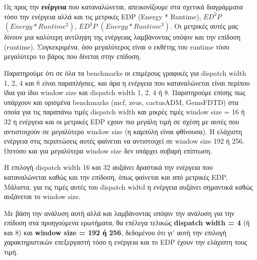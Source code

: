    Ως προς την \textbf{ενέργεια} που καταναλώνεται, απεικονίζουμε στα σχετικά
   διαγράμματα τόσο την ενέργεια αλλά και τις μετρικές EDP (Energy * Runtime),
   $ED^2P$ $(Energy * Runtime^2)$, $ED^3P$ $(Energy * Runtime^3)$. Οι μετρικές
   αυτές μας δίνουν μια καλύτερη αντίληψη της ενέργειας λαμβάνοντας υπόψιν και
   την επίδοση (runtime). Συγκεκριμένα, όσο μεγαλύτερος είναι ο εκθέτης του
   runtime τόσο μεγαλύτερο το βάρος που δίνεται στην επίδοση.
   
   Παρατηρούμε ότι σε όλα τα benchmarks οι επιμέρους γραφικές για dispatch width
   1, 2, 4 και 8 είναι παραπλήσιες, και άρα η ενέργεια που καταναλώνεται είναι
   περίπου ίδια για ίδιο window size και dispatch width  1, 2, 4 ή 8.
   Παρατηρούμε επίσης πως υπάρχουν και ορισμένα benchmarks (mcf, zeus,
   cactusADM, GemsFDTD) στα οποία για τις παραπάνω τιμές dispatch width και
   μικρές τιμές window size = 16 ή 32 η ενέργεια και οι μετρικές EDP εχουν πιο
   μεγάλη τιμή σε σχέση με αυτές που αντιστοιχούν σε μεγαλύτερο window size (η
   καμπύλη είναι φθίνουσα). Η ελάχιστη ενέργεια στις περιπτώσεις αυτές φαίνεται
   να αντιστοιχεί σε window size 192 ή 256. Ωστόσο και για μεγαλύτερα window
   size δεν υπάρχει σοβαρή επίπτωση.
  
   Η επιλογή dispatch width 16 και 32 αυξάνει δραστικά την ενέργεια που
   καταναλώνεται καθώς και την επίδοση, όπως φαίνεται και από μετρικές EDP.
   Mάλιστα, για τις τιμές αυτές του dispatch widtd η ενέργεια αυξάνει
   σημαντικά καθώς αυξάνεται το window size. 
   
   Με βάση την ανάλυση αυτή αλλά και λαμβάνοντας υπόψιν την ανάλυση για την
   επίδοση στα προηγούμενα ερωτήματα, θα επέλεγα τελικώς \textbf{dispatch width
   = 4} (ή και 8) και \textbf{window size = 192 ή 256}, δεδομένου ότι γι' αυτή
   την επιλογή χαρακτηριστικών επεξεργαστή τόσο η ενέργεια και το EDP έχουν την
   ελάχιστη τους τιμή.